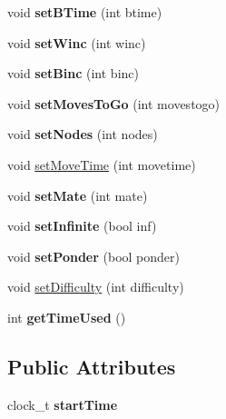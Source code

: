 \begin{DoxyCompactItemize}
\mbox{\label{classdavid_1_1Search_ab6f3d9c3a309f16b12703ccd5422704b}} 
void {\bfseries set\+B\+Time} (int btime)
\item 
\mbox{\label{classdavid_1_1Search_ae9fe5183ac56cbd824fdf6e6b27e6369}} 
void {\bfseries set\+Winc} (int winc)
\item 
\mbox{\label{classdavid_1_1Search_a06bf057ac90a52fcec98ddfc1fa83d88}} 
void {\bfseries set\+Binc} (int binc)
\item 
\mbox{\label{classdavid_1_1Search_a63771eb0bcda5888a34166c1afef579a}} 
void {\bfseries set\+Moves\+To\+Go} (int movestogo)
\item 
\mbox{\label{classdavid_1_1Search_a8d8cb30f3f1675770da222a7a8c31a40}} 
void {\bfseries set\+Nodes} (int nodes)
\item 
void \hyperlink{classdavid_1_1Search_ae56889dbafede8407e4edb397cd2d19b}{set\+Move\+Time} (int movetime)
\item 
\mbox{\label{classdavid_1_1Search_aa88886359a8cc975fb365bb503b07ccc}} 
void {\bfseries set\+Mate} (int mate)
\item 
\mbox{\label{classdavid_1_1Search_aa8bf67dc1ac04b43e97bc6f12076411d}} 
void {\bfseries set\+Infinite} (bool inf)
\item 
\mbox{\label{classdavid_1_1Search_a6dbe689d6ef4b839c49401175f3d0697}} 
void {\bfseries set\+Ponder} (bool ponder)
\item 
void \hyperlink{classdavid_1_1Search_a84aaba374418b295f0a0cfed676114b4}{set\+Difficulty} (int difficulty)
\item 
\mbox{\label{classdavid_1_1Search_ab2c4662e6caa5aa829aec9e8dcf17b63}} 
int {\bfseries get\+Time\+Used} ()
\end{DoxyCompactItemize}
\subsection*{Public Attributes}
\begin{DoxyCompactItemize}
\item 
\mbox{\label{classdavid_1_1Search_a85837d0f20ee7c3d087ed972a3aee903}} 
clock\+\_\+t {\bfseries start\+Time}
\end{DoxyCompactItemize}


